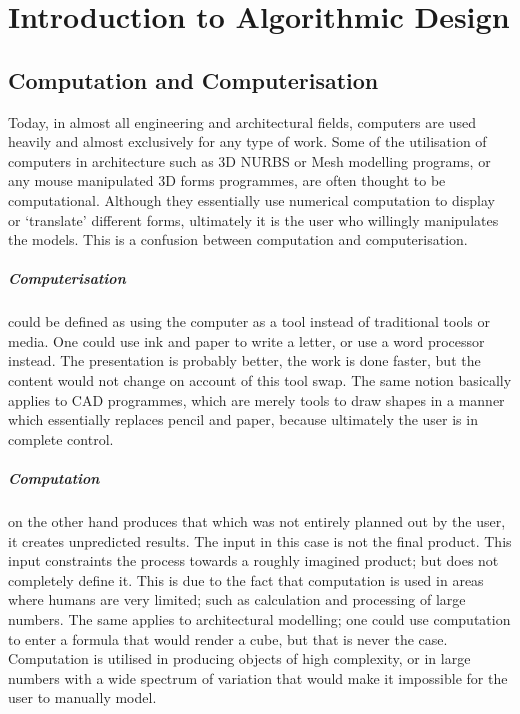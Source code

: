 \chapter{Introduction to Algorithmic Design}

\section{Computation and Computerisation}

Today, in almost all engineering and architectural fields, computers are used heavily and almost
exclusively for any type of work. Some of the utilisation of computers in architecture such as 3D
NURBS or Mesh modelling programs, or any mouse manipulated 3D forms programmes, are often thought to
be computational. Although they essentially use numerical computation to display or `translate'
\cite{terzidis06} different forms, ultimately it is the user who willingly manipulates the models.
This is a confusion between computation and computerisation. 

\paragraph{Computerisation}could be defined as using the computer as a tool instead of traditional
tools or media. One could use ink and paper to write a letter, or use a word processor instead. The
presentation is probably better, the work is done faster, but the content would not change on
account of this tool swap. The same notion basically applies to CAD programmes, which are merely
tools to draw shapes in a manner which essentially replaces pencil and paper, because ultimately the
user is in complete control.

\paragraph{Computation}on the other hand produces that which was not entirely planned out by the
user, it creates unpredicted results. The input in this case is not the final product. This input constraints
the process towards a roughly imagined product; but does not completely define it. This is due to the
fact that computation is used in areas where humans are very limited; such as calculation and
processing of large numbers. The same applies to architectural modelling; one could use computation
to enter a formula that would render a cube, but that is never the case. Computation is utilised in
producing objects of high complexity, or in large numbers with a wide spectrum of variation that
would make it impossible for the user to manually model.

